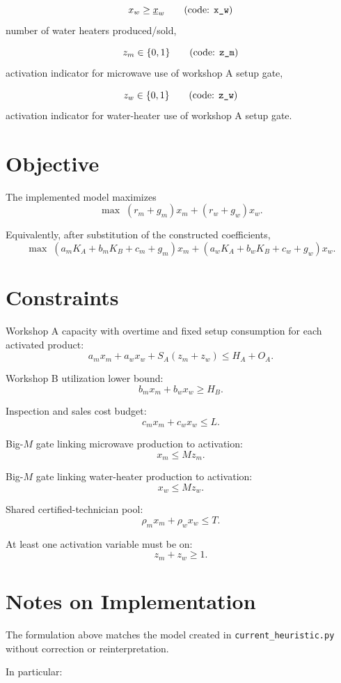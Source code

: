 \[
x_w \ge \underline{x}_w
\qquad
\text{(code: \texttt{x\_w})}
\]
number of water heaters produced/sold,

\[
z_m \in \{0,1\}
\qquad
\text{(code: \texttt{z\_m})}
\]
activation indicator for microwave use of workshop A setup gate,

\[
z_w \in \{0,1\}
\qquad
\text{(code: \texttt{z\_w})}
\]
activation indicator for water-heater use of workshop A setup gate.

\section*{Objective}

The implemented model maximizes
\[
\max \; (r_m+g_m)x_m + (r_w+g_w)x_w.
\]

Equivalently, after substitution of the constructed coefficients,
\[
\max \; (a_m K_A+b_m K_B+c_m+g_m)x_m
      + (a_w K_A+b_w K_B+c_w+g_w)x_w.
\]

\section*{Constraints}

Workshop A capacity with overtime and fixed setup consumption for each activated product:
\[
a_m x_m + a_w x_w + S_A(z_m+z_w) \le H_A + O_A.
\]

Workshop B utilization lower bound:
\[
b_m x_m + b_w x_w \ge H_B.
\]

Inspection and sales cost budget:
\[
c_m x_m + c_w x_w \le L.
\]

Big-\(M\) gate linking microwave production to activation:
\[
x_m \le M z_m.
\]

Big-\(M\) gate linking water-heater production to activation:
\[
x_w \le M z_w.
\]

Shared certified-technician pool:
\[
\rho_m x_m + \rho_w x_w \le T.
\]

At least one activation variable must be on:
\[
z_m + z_w \ge 1.
\]

\section*{Notes on Implementation}

The formulation above matches the model created in \texttt{current\_heuristic.py} without correction or reinterpretation.

In particular:

